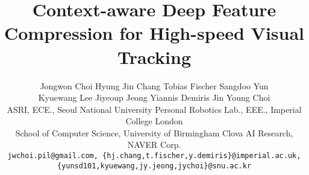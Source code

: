 \documentclass[10pt,twocolumn,letterpaper]{article}
\begin{document}
\begin{acronym}[TRACA] 
\end{acronym}


\title{Context-aware Deep Feature Compression for High-speed Visual Tracking}
\vspace{-3cm}
\author{Jongwon Choi \quad Hyung Jin Chang \quad Tobias Fischer \quad Sangdoo Yun \\ Kyuewang Lee \quad Jiyeoup Jeong \quad Yiannis Demiris \quad Jin Young Choi\\
{\small \hspace{1cm}ASRI, ECE., Seoul National University}
{\small \hspace{1cm}Personal Robotics Lab., EEE., Imperial College London}\\
{\small \hspace{-1.5cm}School of Computer Science, University of Birmingham}
{\small \hspace{1.5cm}Clova AI Research, NAVER Corp.}\\
{\tt\scriptsize jwchoi.pil@gmail.com, \{hj.chang,t.fischer,y.demiris\}@imperial.ac.uk, \{yunsd101,kyuewang,jy.jeong,jychoi\}@snu.ac.kr}
}

\maketitle
\thispagestyle{empty}

\end{document}
